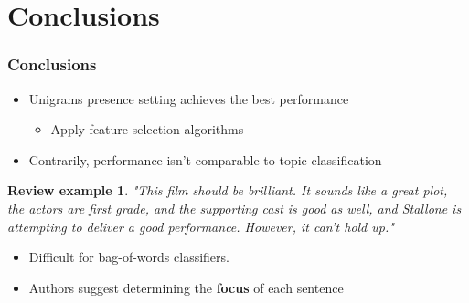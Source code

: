 \documentclass{beamer}
\newtheorem{snt}{Review example}
\begin{document}
\section{Conclusions}
\begin{frame}
	\frametitle{Conclusions}
	\begin{itemize}
		\item Unigrams presence setting achieves the best performance
		\begin{itemize}
			\item Apply feature selection algorithms
		\end{itemize}
		\item Contrarily, performance isn't comparable to topic classification 
	\end{itemize}
	
	\begin{snt}
		"This film should be brilliant. It sounds like a great plot, the actors are first grade, and the supporting cast is good as well, and Stallone is attempting to deliver a good performance. However, it can't hold up."
	\end{snt}
	\pause
	
	\begin{itemize}
		\item Difficult for bag-of-words classifiers.
		\item Authors suggest determining the \textbf{focus} of each sentence
	\end{itemize}
\end{frame}
\end{document}

